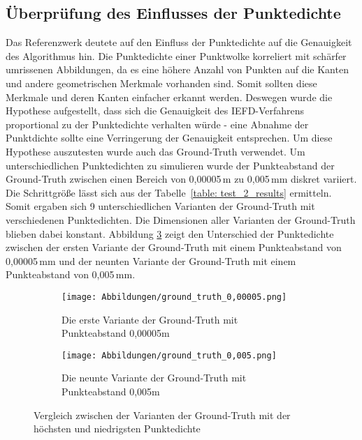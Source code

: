\subsection{Überprüfung des Einflusses der Punktedichte} \label{test_2}
Das Referenzwerk \autocite{ni_edge_2016} deutete auf den Einfluss der Punktedichte auf die Genauigkeit des Algorithmus hin. Die Punktedichte einer Punktwolke korreliert mit schärfer umrissenen Abbildungen, da es eine höhere Anzahl von Punkten auf die Kanten und andere geometrischen Merkmale vorhanden sind. Somit sollten diese Merkmale und deren Kanten einfacher erkannt werden. Deswegen wurde die Hypothese aufgestellt, dass sich die Genauigkeit des IEFD-Verfahrens proportional zu der Punktedichte verhalten würde - eine Abnahme der Punktdichte sollte eine Verringerung der Genauigkeit entsprechen. Um diese Hypothese auszutesten wurde auch das Ground-Truth verwendet. Um unterschiedlichen Punktedichten zu simulieren wurde der Punkteabstand der Ground-Truth zwischen einen Bereich von 0,00005\,\si{\m} zu 0,005\,\si{\m}m diskret variiert. Die Schrittgröße lässt sich aus der Tabelle~\ref{table: test_2_results} ermitteln. Somit ergaben sich 9 unterschiedlichen Varianten der Ground-Truth mit verschiedenen Punktedichten. Die Dimensionen aller Varianten der Ground-Truth blieben dabei konstant. Abbildung \ref{fig: testdata_pointdensity_comparision} zeigt den Unterschied der Punktedichte zwischen der ersten Variante der Ground-Truth mit einem Punkteabstand von 0,00005\,\si{\m}m und der neunten Variante der Ground-Truth mit einem Punkteabstand von 0,005\,\si{\m}m.

\begin{figure}[h]
	\centering
	\begin{subfigure}{0.49\textwidth}
		\texttt{[image: Abbildungen/ground\_truth\_0,00005.png]}
		\centering
		\caption{Die erste Variante der Ground-Truth mit Punkteabstand 0,00005m}
		\label{fig: testdata_0,00005m}
	\end{subfigure}
	\hfill
	\begin{subfigure}{0.49\textwidth}
		\texttt{[image: Abbildungen/ground\_truth\_0,005.png]}
		\centering
		\caption{Die neunte Variante der Ground-Truth mit Punkteabstand 0,005m}
		\label{fig: testdata_0,005m}
	\end{subfigure}
	\caption{Vergleich zwischen der Varianten der Ground-Truth mit der höchsten und niedrigsten Punktedichte}
	\label{fig: testdata_pointdensity_comparision}
\end{figure}

